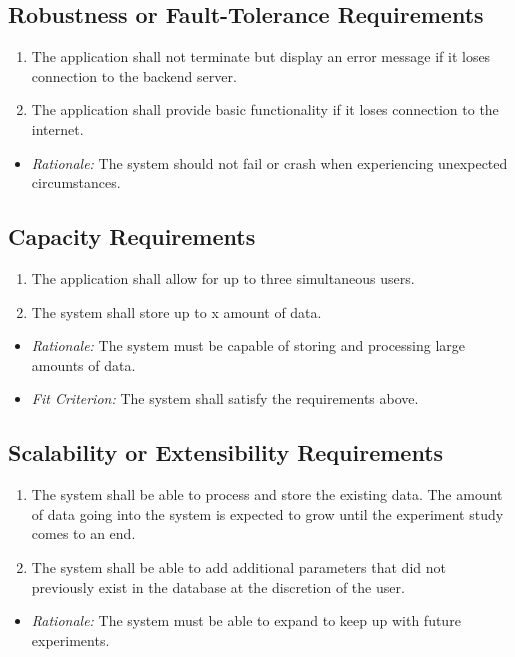 \documentclass[12pt]{article}
\begin{document}
\subsection{Robustness or Fault-Tolerance Requirements}
\begin{enumerate}
  \item The application shall not terminate but display an error message if it loses connection to the backend server.
  \item The application shall provide basic functionality if it loses connection to the internet.
\end{enumerate}
\begin{itemize}
  \item \textit{Rationale:} The system should not fail or crash when experiencing unexpected circumstances.
\end{itemize}

\subsection{Capacity Requirements}
\begin{enumerate}
  \item The application shall allow for up to three simultaneous users.
  \item The system shall store up to x amount of data.
\end{enumerate}
\begin{itemize}
  \item \textit{Rationale:} The system must be capable of storing and processing large amounts of data.
  \item \textit{Fit Criterion:} The system shall satisfy the requirements above.
\end{itemize}

\subsection{Scalability or Extensibility Requirements}
\begin{enumerate}
  \item The system shall be able to process and store the existing data. The amount of data going into the system is expected to grow until the experiment study comes to an end.
  \item The system shall be able to add additional parameters that did not previously exist in the database at the discretion of the user.
\end{enumerate}
\begin{itemize}
  \item \textit{Rationale:} The system must be able to expand to keep up with future experiments.
\end{itemize}
\end{document}
